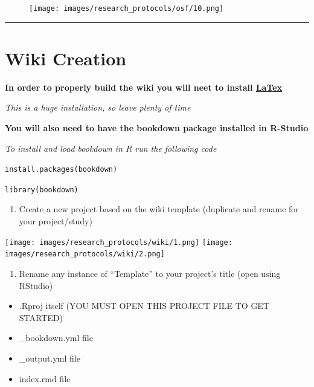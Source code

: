 \documentclass[
]{book}
\providecommand{\tightlist}{%
  \setlength{\itemsep}{0pt}\setlength{\parskip}{0pt}}
\begin{document}
\begin{figure}
\centering
\texttt{[image: images/research\_protocols/osf/10.png]}
\caption{}
\end{figure}

\begin{center}\rule{0.5\linewidth}{0.5pt}\end{center}

\hypertarget{wiki-creation}{%
\section{Wiki Creation}\label{wiki-creation}}

\textbf{In order to properly build the wiki you will neet to install \href{https://www.latex-project.org/}{LaTex}}

\emph{This is a huge installation, so leave plenty of time}

\textbf{You will also need to have the bookdown package installed in R-Studio}

\emph{To install and load bookdown in R run the following code}

\texttt{install.packages(\textquotesingle{}bookdown\textquotesingle{})}

\texttt{library(bookdown)}

\begin{enumerate}
\def\labelenumi{\arabic{enumi}.}
\tightlist
\item
  Create a new project based on the wiki template (duplicate and rename for your project/study)
\end{enumerate}

\texttt{[image: images/research\_protocols/wiki/1.png]}
\texttt{[image: images/research\_protocols/wiki/2.png]}

\begin{enumerate}
\def\labelenumi{\arabic{enumi}.}
\setcounter{enumi}{1}
\tightlist
\item
  Rename any instance of ``Template'' to your project's title (open using RStudio)
\end{enumerate}

\begin{itemize}
\tightlist
\item
  .Rproj itself (YOU MUST OPEN THIS PROJECT FILE TO GET STARTED)
\item
  \_bookdown.yml file
\item
  \_output.yml file
\item
  index.rmd file
\end{itemize}
\end{document}
